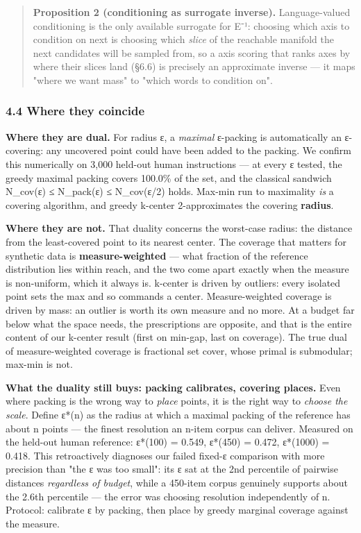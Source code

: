 \documentclass[
  10pt,
]{article}
\theoremstyle{plain}
\theoremstyle{definition}
\begin{document}
\begin{quote}
\textbf{Proposition 2 (conditioning as surrogate inverse).}
Language-valued conditioning is the only available surrogate for E⁻¹:
choosing which axis to condition on next is choosing which \emph{slice}
of the reachable manifold the next candidates will be sampled from, so a
axis scoring that ranks axes by where their slices land (§6.6) is
precisely an approximate inverse --- it maps "where we want mass" to
"which words to condition on".
\end{quote}

\subsubsection{4.4 Where they coincide}\label{44-where-they-coincide}

\textbf{Where they are dual.} For radius ε, a \emph{maximal} ε-packing
is automatically an ε-covering: any uncovered point could have been
added to the packing. We confirm this numerically on 3,000 held-out
human instructions --- at every ε tested, the greedy maximal packing
covers 100.0\% of the set, and the classical sandwich N\_cov(ε) ≤
N\_pack(ε) ≤ N\_cov(ε/2) holds. Max-min run to maximality \emph{is} a
covering algorithm, and greedy k-center 2-approximates the covering
\textbf{radius}.

\textbf{Where they are not.} That duality concerns the worst-case
radius: the distance from the least-covered point to its nearest center.
The coverage that matters for synthetic data is
\textbf{measure-weighted} --- what fraction of the reference
distribution lies within reach, and the two come apart exactly when the
measure is non-uniform, which it always is. k-center is driven by
outliers: every isolated point sets the max and so commands a center.
Measure-weighted coverage is driven by mass: an outlier is worth its own
measure and no more. At a budget far below what the space needs, the
prescriptions are opposite, and that is the entire content of our
k-center result (first on min-gap, last on coverage). The true dual of
measure-weighted coverage is fractional set cover, whose primal is
submodular; max-min is not.

\textbf{What the duality still buys: packing calibrates, covering
places.} Even where packing is the wrong way to \emph{place} points, it
is the right way to \emph{choose the scale}. Define ε*(n) as the radius
at which a maximal packing of the reference has about n points --- the
finest resolution an n-item corpus can deliver. Measured on the held-out
human reference: ε*(100) = 0.549, ε*(450) = 0.472, ε*(1000) = 0.418.
This retroactively diagnoses our failed fixed-ε comparison with more
precision than "the ε was too small": its ε sat at the 2nd percentile of
pairwise distances \emph{regardless of budget}, while a 450-item corpus
genuinely supports about the 2.6th percentile --- the error was choosing
resolution independently of n. Protocol: calibrate ε by packing, then
place by greedy marginal coverage against the measure.
\end{document}

